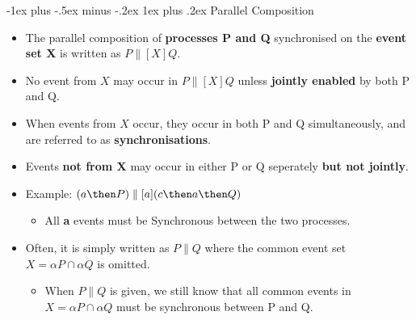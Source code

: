 \documentclass[10pt, landscape]{article}
\makeatletter
\renewcommand{\subsubsection}{\@startsection{subsubsection}{3}{0mm}%
  {-1ex plus -.5ex minus -.2ex}%
  {1ex plus .2ex}%
{\normalfont\small\bfseries}}%
\makeatother
\begin{document}
\begin{multicols*}{3}
  \subsubsection{Parallel Composition}
  \begin{itemize}
    \item The parallel composition of \textbf{processes P and Q} synchronised on the \textbf{event set X} is written as $P \parallel[X] Q$.
    \item No event from $X$ may occur in $P \parallel[X] Q$ unless \textbf{jointly enabled} by both P and Q.
    \item When events from $X$ occur, they occur in both P and Q simultaneously, and are referred to as \textbf{synchronisations}. 
    \item Events \textbf{not from X} may occur in either P or Q seperately \textbf{but not jointly}.
    \item Example: $(a \then P) \parallel[a] (c \then a \then Q)$
    \begin{itemize}
        \item All \textbf{a} events must be Synchronous between the two processes.
    \end{itemize}
    \item Often, it is simply written as $P \parallel Q$ where the common event set $X = \alpha P \cap \alpha Q$ is omitted.
    \begin{itemize}
        \item When $P \parallel Q$ is given, we still know that all common events in $X = \alpha P \cap \alpha Q$ must be synchronous between P and Q.
    \end{itemize}
  \end{itemize}


\end{multicols*}
\end{document}
